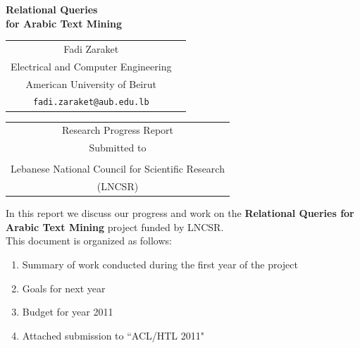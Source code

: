 \documentclass[12pt]{article}
\begin{document}
\pagestyle{fancy}
\chead{}
\rhead{}

\cfoot{}
\renewcommand{\footrulewidth}{0.2pt}
\renewcommand{\headrulewidth}{0.2pt}


\begin{center}
{\Large \bf Relational Queries \\
for Arabic Text Mining }

\vspace{1.5in}

\renewcommand{\arraystretch}{.6}
\begin{tabular}{cc}
Fadi Zaraket \\
Electrical and Computer Engineering  \\
American University of Beirut \\
{\tt fadi.zaraket@aub.edu.lb} 
\end{tabular}

\vspace{1.5in}

\renewcommand{\arraystretch}{.6}
\begin{tabular}{c}
{\small Research Progress Report } \\
{\small Submitted to }\\
\\
    Lebanese National Council for Scientific Research \\
    (LNCSR)
\end{tabular}
\vspace{.5in}

\date{\today}
\pagebreak

\end{center}


In this report we discuss our progress and work on the 
{\bf Relational Queries for Arabic Text Mining} project 
funded by LNCSR.
\\

This document is organized as follows:
\begin{enumerate}
\item Summary of work conducted during the first year of the project
\item Goals for next year
\item Budget for year 2011
\item Attached submission to ``ACL/HTL 2011"
\end{enumerate}
\pagebreak
\end{document}
